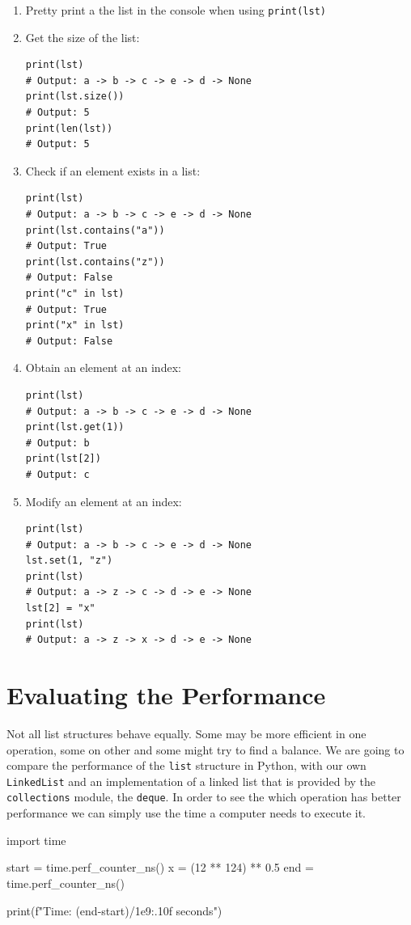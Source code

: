 \documentclass[10pt,a4paper]{article}
\begin{document}
\begin{enumerate}
	\item Pretty print a the list in the console when using \lstinline|print(lst)|
	\item Get the size of the list:
\begin{lstlisting}
print(lst)
# Output: a -> b -> c -> e -> d -> None
print(lst.size())
# Output: 5
print(len(lst))
# Output: 5
\end{lstlisting}
	\item Check if an element exists in a list:
\begin{lstlisting}
print(lst)
# Output: a -> b -> c -> e -> d -> None
print(lst.contains("a"))
# Output: True
print(lst.contains("z"))
# Output: False
print("c" in lst)
# Output: True
print("x" in lst)
# Output: False
\end{lstlisting}
	\item Obtain an element at an index:
\begin{lstlisting}
print(lst)
# Output: a -> b -> c -> e -> d -> None
print(lst.get(1))
# Output: b
print(lst[2])
# Output: c
\end{lstlisting}
	\item Modify an element at an index:
\begin{lstlisting}
print(lst)
# Output: a -> b -> c -> e -> d -> None
lst.set(1, "z")
print(lst)
# Output: a -> z -> c -> d -> e -> None
lst[2] = "x"
print(lst)
# Output: a -> z -> x -> d -> e -> None
\end{lstlisting}
\end{enumerate}

\section*{Evaluating the Performance}
Not all list structures behave equally. Some may be more efficient in one operation, some on other and some might try to find a balance. We are going to compare the performance of the \lstinline|list| structure in Python, with our own \lstinline|LinkedList| and an implementation of a linked list that is provided by the \lstinline|collections| module, the \lstinline|deque|. In order to see the which operation has better performance we can simply use the time a computer needs to execute it.

\begin{attachedlisting}[time]
import time

start = time.perf_counter_ns()
x = (12 ** 124) ** 0.5
end = time.perf_counter_ns()

print(f"Time: {(end-start)/1e9:.10f} seconds")
\end{attachedlisting}
\end{document}
